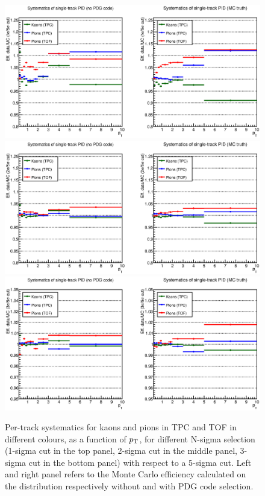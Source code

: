 \begin{figure}[!h]
 \centering
 \includegraphics[angle=0, width=13cm]{./FigCap5/PIDsyst_1over5sigmaCut.eps}
 \includegraphics[angle=0, width=13cm]{./FigCap5/PIDsyst_2over5sigmaCut.eps}
 \includegraphics[angle=0, width=13cm]{./FigCap5/PIDsyst_3over5sigmaCut.eps}
 \caption{Per-track systematics for kaons and pions in TPC and TOF in different colours, as a function of $p_{\rm T}$, for different N-sigma selection (1-sigma cut in the top panel, 2-sigma cut in the middle panel, 3-sigma cut in the bottom panel) with respect to a 5-sigma cut. Left and right panel refers to the Monte Carlo efficiency calculated on the distribution respectively without and with PDG code selection.}
 \label{fig:PerTrackPIDsys} 
\end{figure}

